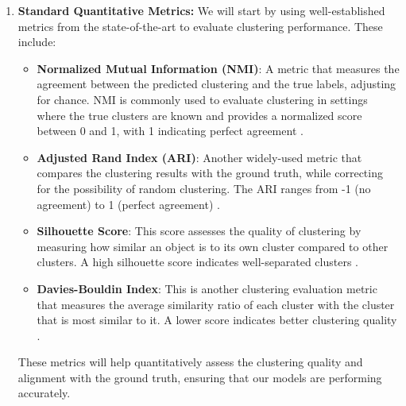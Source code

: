 \documentclass[11pt]{article}
\begin{document}
\begin{enumerate}
    \item \textbf{Standard Quantitative Metrics:}  
    We will start by using well-established metrics from the state-of-the-art to evaluate clustering performance. These include:
    \begin{itemize}
        \item \textbf{Normalized Mutual Information (NMI)}: A metric that measures the agreement between the predicted clustering and the true labels, adjusting for chance. NMI is commonly used to evaluate clustering in settings where the true clusters are known and provides a normalized score between 0 and 1, with 1 indicating perfect agreement \cite{nmi_2017}.
        \item \textbf{Adjusted Rand Index (ARI)}: Another widely-used metric that compares the clustering results with the ground truth, while correcting for the possibility of random clustering. The ARI ranges from -1 (no agreement) to 1 (perfect agreement) \cite{ari_2002}.
        \item \textbf{Silhouette Score}: This score assesses the quality of clustering by measuring how similar an object is to its own cluster compared to other clusters. A high silhouette score indicates well-separated clusters \cite{silhouette_1987}.
        \item \textbf{Davies-Bouldin Index}: This is another clustering evaluation metric that measures the average similarity ratio of each cluster with the cluster that is most similar to it. A lower score indicates better clustering quality \cite{davies_bouldin_1979}.
    \end{itemize}

    These metrics will help quantitatively assess the clustering quality and alignment with the ground truth, ensuring that our models are performing accurately.


\end{enumerate}
\end{document}
